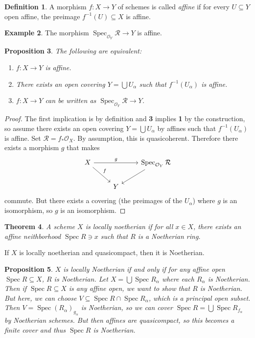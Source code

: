 \documentclass[leqno, openany]{memoir}
\newtheorem{thm}{Theorem}[section]
\newtheorem{prop}[thm]{Proposition}
\theoremstyle{definition}
\newtheorem{defn}[thm]{Definition}
\newtheorem{exm}[thm]{Example}
\theoremstyle{remark}
\theoremstyle{plain}
\theoremstyle{definition}
\theoremstyle{remark}
\newcommand{\mc}[1]{\mathcal{#1}}
\DeclareMathOperator{\Spec}{Spec}
\begin{document}
\begin{defn} A morphism $f \colon X \to Y$ of schemes is called \textit{affine}
if for every $U \subseteq Y$ open affine, the preimage $f^{-1}(U) \subseteq X$
is affine.  \end{defn}

\begin{exm} The morphism $\Spec_{\mc{O}_Y} \mc{R} \to Y$ is affine.  \end{exm}

\begin{prop} The following are equivalent: \begin{enumerate} \item $f \colon X
    \to Y$ is affine.  \item There exists an open covering $Y = \bigcup
    U_{\alpha}$ such that $f^{-1}(U_{\alpha})$ is affine.  \item $f \colon X
    \to Y$ can be written as $\Spec_{\mc{O}_Y} \mc{R} \to Y$.  \end{enumerate}
\end{prop}

\begin{proof} The first implication is by definition and \textbf{3} implies
    \textbf{1} by the construction, so assume there exists an open covering $Y
    = \bigcup U_{\alpha}$ by affines such that $f^{-1}(U_{\alpha})$ is affine.
    Set $\mc{R} = f_* \mc{O}_X$. By assumption, this is quasicoherent.
    Therefore there exists a morphism $g$ that makes \begin{equation*}
        \begin{tikzcd} X \arrow{rr}{g} \arrow{dr}{f} & & \Spec_{\mc{O}_Y}
        \mc{R} \arrow{dl} \\ & Y \end{tikzcd} \end{equation*} commute. But
        there exists a covering (the preimages of the $U_{\alpha}$) where $g$
        is an isomorphism, so $g$ is an isomorphism.  \end{proof}

\begin{thm} A scheme $X$ is \textit{locally noetherian} if for all $x \in X$,
there exists an affine neithborhood $\Spec R \ni x$ such that $R$ is a
Noetherian ring.  \end{thm}

If $X$ is locally noetherian and quasicompact, then it is Noetherian.

\begin{prop} $X$ is locally Noetherian if and only if for any affine open
    $\Spec R \subseteq X$, $R$ is Noetherian. Let $X = \bigcup \Spec
    R_{\alpha}$ where each $R_{\alpha}$ is Noetherian. Then if $\Spec R
    \subseteq X$ is any affine open, we want to show that $R$ is Noetherian.
    But here, we can choose $V \subseteq \Spec R \cap \Spec R_{\alpha}$, which
    is a principal open subset. Then $V = \Spec { (R_{\alpha}) }_{g_{\alpha}}$
    is Noetherian, so we can cover $\Spec R = \bigcup \Spec R_{f_{\alpha}}$ by
    Noetherian schemes. But then affines are quasicompact, so this becomes a
    finite cover and thus $\Spec R$ is Noetherian.  \end{prop}
\end{document}
